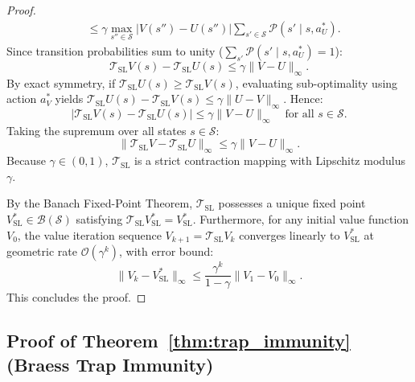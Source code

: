 \documentclass[11pt,a4paper]{article}
\begin{document}
\begin{proof}
\begin{align}
&\le \gamma \max_{s'' \in \mathcal{S}} \left| V(s'') - U(s'') \right| \sum_{s' \in \mathcal{S}} \mathcal{P}(s' \mid s, a_U^*).
\end{align}
Since transition probabilities sum to unity ($\sum_{s'} \mathcal{P}(s' \mid s, a_U^*) = 1$):
\begin{equation}
\mathcal{T}_{\text{SL}} V(s) - \mathcal{T}_{\text{SL}} U(s) \le \gamma \|V - U\|_\infty.
\end{equation}
By exact symmetry, if $\mathcal{T}_{\text{SL}} U(s) \ge \mathcal{T}_{\text{SL}} V(s)$, evaluating sub-optimality using action $a_V^*$ yields $\mathcal{T}_{\text{SL}} U(s) - \mathcal{T}_{\text{SL}} V(s) \le \gamma \|U - V\|_\infty$. Hence:
\begin{equation}
\left| \mathcal{T}_{\text{SL}} V(s) - \mathcal{T}_{\text{SL}} U(s) \right| \le \gamma \|V - U\|_\infty \quad \text{for all } s \in \mathcal{S}.
\end{equation}
Taking the supremum over all states $s \in \mathcal{S}$:
\begin{equation}
\|\mathcal{T}_{\text{SL}} V - \mathcal{T}_{\text{SL}} U\|_\infty \le \gamma \|V - U\|_\infty.
\end{equation}
Because $\gamma \in (0, 1)$, $\mathcal{T}_{\text{SL}}$ is a strict contraction mapping with Lipschitz modulus $\gamma$.

By the Banach Fixed-Point Theorem, $\mathcal{T}_{\text{SL}}$ possesses a unique fixed point $V_{\text{SL}}^* \in \mathcal{B}(\mathcal{S})$ satisfying $\mathcal{T}_{\text{SL}} V_{\text{SL}}^* = V_{\text{SL}}^*$. Furthermore, for any initial value function $V_0$, the value iteration sequence $V_{k+1} = \mathcal{T}_{\text{SL}} V_k$ converges linearly to $V_{\text{SL}}^*$ at geometric rate $\mathcal{O}(\gamma^k)$, with error bound:
\begin{equation}
\|V_k - V_{\text{SL}}^*\|_\infty \le \frac{\gamma^k}{1 - \gamma} \|V_1 - V_0\|_\infty.
\end{equation}
This concludes the proof.
\end{proof}

\subsection{Proof of Theorem~\ref{thm:trap_immunity} (Braess Trap Immunity)}
\label{subsec:proof_thm3}
\end{document}

